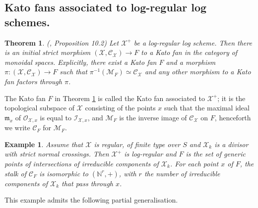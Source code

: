 \documentclass{amsart}%
\numberwithin{equation}{subsection}
\theoremstyle{plain2}
\newtheorem{thm}[equation]{Theorem}
\theoremstyle{definition2}
\newtheorem{example}[equation]{Example}
\theoremstyle{stepstyle}
\theoremstyle{point}
\theoremstyle{subpoint}
\newcommand{\N}{\ensuremath{\mathbb{N}}}
\newcommand{\cX}{\ensuremath{\mathscr{X}}}
\newcommand{\caM}{\ensuremath{\mathcal{M}}}
\newcommand{\caC}{\ensuremath{\mathcal{C}}}
\begin{document}
\subsection{Kato fans associated to log-regular log schemes.}
\begin{thm}\label{kato fan associated} (\cite{Kato1994a}, Proposition 10.2)
Let $\cX^+$ be a log-regular log scheme. Then there is an initial strict morphism $(\cX, \caC_{\cX}) \rightarrow F$ to a Kato fan in the category of monoidal spaces. Explicitly, there exist a Kato fan $F$ and a morphism $\pi: (\cX, \caC_{\cX}) \rightarrow F$ such that $\pi^{-1}(\caM_{F}) \simeq \caC_{\cX}$ and any other morphism to a Kato fan factors through $\pi$.
\end{thm}
The Kato fan $F$ in Theorem \ref{kato fan associated} is called the Kato fan associated to $\cX^+$; it is the topological subspace of
$\cX$ consisting of the points $x$ such that the maximal ideal $\mathfrak{m}_x$ of
$\mathcal{O}_{\cX,x}$ is equal to $\mathcal{I}_{\cX,x}$, and
$\mathcal{M}_F$ is the inverse image of $\mathcal{C}_{\cX}$ on
$F$, henceforth we write $\caC_F$ for $\caM_F$.

\begin{example} \label{example kato fan regular model}
Assume that $\cX$ is regular, of finite type over $S$ and $\cX_k$ is a divisor with strict
normal crossings. Then $\cX^+$ is log-regular and $F$ is the set
of generic points of intersections of irreducible components of
$\cX_k$. For each point $x$ of $F$, the stalk of $\mathcal{C}_F$
is isomorphic to $(\N^r,+)$, with $r$ the number of irreducible
components of $\cX_k$ that pass through $x$.
\end{example}

This example admits the following partial generalisation.
\end{document}
